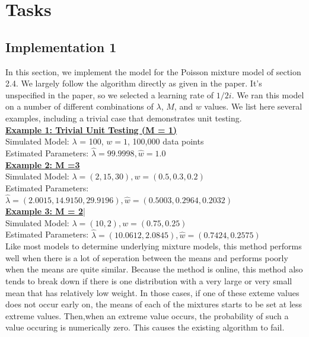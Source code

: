 \documentclass[12pt]{article}
\begin{document}
\section{Tasks}
\subsection{Implementation 1}
In this section, we implement the model for the Poisson mixture model of section 2.4. We largely follow the algorithm directly as given in the paper. It's unspecified in the paper, so we selected a learning rate of $1/2i$. We ran this model on a number of different combinations of $\lambda$, $M$, and $w$ values. We list here several examples, including a trivial case that demonstrates unit testing. \\

\noindent \underline{\textbf{Example 1: Trivial Unit Testing (M = 1)} }\\ 
\indent Simulated Model: $\lambda$  = 100, $w = 1$, 100,000 data points\\
\indent Estimated Parameters: $ \hat{\lambda} = 99.9998, \hat{w} =  1.0$\\

\noindent \underline{\textbf{Example 2: M =3 }}\\
\indent Simulated Model: $\lambda = (2, 15, 30), w = (0.5, 0.3, 0.2)$\\
\indent Estimated Parameters: $\hat{\lambda} = (2.0015, 14.9150, 29.9196), \hat{w} = (0.5003, 0.2964, 0.2032)$ \\

\noindent \underline{\textbf{Example 3: M = 2}}|\\
\indent Simulated Model: $\lambda = (10,2), w = (0.75, 0.25)$\\
\indent Estimated Parameters: $\hat{\lambda} = (10.0612, 2.0845), \hat{w} = ( 0.7424, 0.2575) $ \\

\noindent Like most models to determine underlying mixture models, this method performs well when there is a lot of seperation between the means and performs poorly when the means are quite similar. Because the method is online, this method also tends to break down if there is one  distribution with a very large or very small mean that has relatively low weight. In those cases, if one of these exteme values does not occur early on, the means of each of the mixtures starts to be set at less extreme values. Then,when an extreme value occurs, the probability of such a value occuring is numerically zero. This causes the existing algorithm to fail. 
\end{document}

